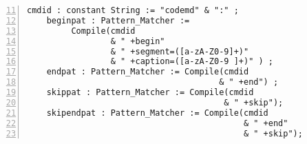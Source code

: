 \lstset{language=Ada, caption=impl.adb: Patterns for codemd markup}
\begin{tcolorbox}[width=\linewidth, sharp corners=all, colback=white!95!black]
\begin{lstlisting}[frame=single, numbers=left, numbersep=5pt, firstnumber= 11]
    cmdid : constant String := "codemd" & ":" ;
    beginpat : Pattern_Matcher := 
         Compile(cmdid 
                 & " +begin" 
                 & " +segment=([a-zA-Z0-9]+)"
                 & " +caption=([a-zA-Z0-9 ]+)" ) ;
    endpat : Pattern_Matcher := Compile(cmdid 
                                       & " +end") ;
    skippat : Pattern_Matcher := Compile(cmdid 
                                        & " +skip");
    skipendpat : Pattern_Matcher := Compile(cmdid 
                                            & " +end"
                                            & " +skip");
\end{lstlisting}
\end{tcolorbox}
